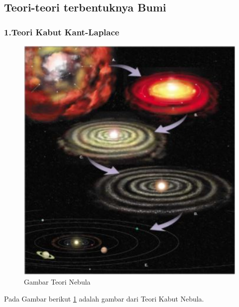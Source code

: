 \subsection{Teori-teori terbentuknya Bumi}
\subsubsection{1.Teori Kabut Kant-Laplace}
\begin{figure} [ht]
	\centerline{\includegraphics[width=1\textwidth]{figures/teorikabutnebula.JPG}}
	\caption{Gambar Teori Nebula}
	\label{teorikabutnebula}
	\end{figure}
	Pada Gambar berikut \ref{teorikabutnebula} adalah gambar dari Teori Kabut Nebula.
